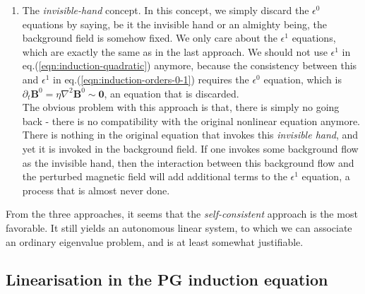 \begin{enumerate}
    \item The \textit{invisible-hand} concept. In this concept, we simply discard the $\epsilon^0$ equations by saying, be it the invisible hand or an almighty being, the background field is somehow fixed. We only care about the $\epsilon^1$ equations, which are exactly the same as in the last approach. We should not use $\epsilon^1$ in eq.(\ref{eqn:induction-quadratic}) anymore, because the consistency between this and $\epsilon^1$ in eq.(\ref{eqn:induction-orders-0-1}) requires the $\epsilon^0$ equation, which is $\partial_t \mathbf{B}^0 = \eta \nabla^2 \mathbf{B}^0 \sim \mathbf{0}$, an equation that is discarded. \\
    The obvious problem with this approach is that, there is simply no going back - there is no compatibility with the original nonlinear equation anymore. There is nothing in the original equation that invokes this \textit{invisible hand}, and yet it is invoked in the background field. If one invokes some background flow as the invisible hand, then the interaction between this background flow and the perturbed magnetic field will add additional terms to the $\epsilon^1$ equation, a process that is almost never done.
\end{enumerate}
From the three approaches, it seems that the \textit{self-consistent} approach is the most favorable. It still yields an autonomous linear system, to which we can associate an ordinary eigenvalue problem, and is at least somewhat justifiable.

\subsection{Linearisation in the PG induction equation}

